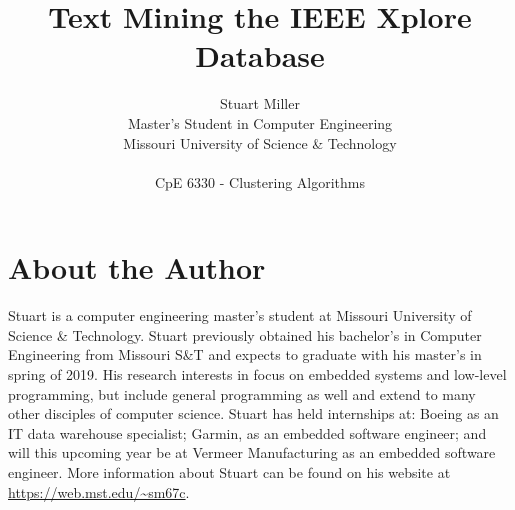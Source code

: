 \documentclass{article}
\begin{document}

\title{Text Mining the IEEE Xplore Database}
\author{Stuart Miller\\
Master's Student in Computer Engineering\\
Missouri University of Science \& Technology \\ \\
CpE 6330 - Clustering Algorithms}

\maketitle

\vspace*{1.0in}

\section*{About the Author}

Stuart is a computer engineering master's student at Missouri University of Science \& Technology. Stuart previously obtained his bachelor's in Computer Engineering from Missouri S\&T and expects to graduate with his master's in spring of 2019. His research interests in focus on embedded systems and low-level programming, but include general programming as well and extend to many other disciples of computer science. Stuart has held internships at: Boeing as an IT data warehouse specialist; Garmin, as an embedded software engineer; and will this upcoming year be at Vermeer Manufacturing as an embedded software engineer. More information about Stuart can be found on his website at \url{https://web.mst.edu/~sm67c}.
\end{document}
